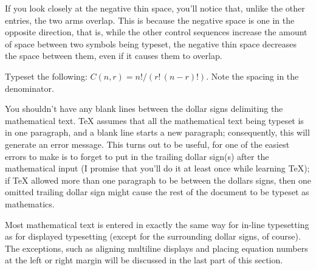 
\toindex{\sp} 
\toindex{;} 
\toindex{>} 
\toindex{,} 
\toindex{!} 

If you look closely at the negative thin space, you'll notice 
that, unlike the other entries, the two arms overlap.  This is 
because the negative space is one in the opposite direction, that 
is, while the other control sequences increase the amount of 
space between two symbols being typeset, the negative thin space 
decreases the space between them, even if it causes them to 
overlap. 

\exercise Typeset the following: $C(n,r) = n!/(r!\,(n-r)!)$\null. Note the 
spacing in the denominator. 
\bigskip 

You shouldn't have any blank lines between the dollar signs 
delimiting the mathematical text. \TeX{} assumes that all the 
mathematical text being typeset is in one paragraph, and a blank 
line starts a new paragraph; consequently, this will generate an 
error message. This turns out to be useful, for one of the 
easiest errors to make is to forget to put in the trailing dollar 
sign(s) after the mathematical input (I promise that you'll do it 
at least once while learning \TeX{}); if \TeX{} allowed more than 
one paragraph to be between the dollars signs, then one omitted 
trailing dollar sign might cause the rest of the document to be 
typeset as mathematics. 

Most mathematical text is entered in exactly the same way for 
in-line typesetting as for displayed typesetting (except for the 
surrounding dollar signs, of course). The exceptions, such as 
aligning multiline displays and placing equation numbers at the 
left or right margin will be discussed in the last part of this 
section. 


